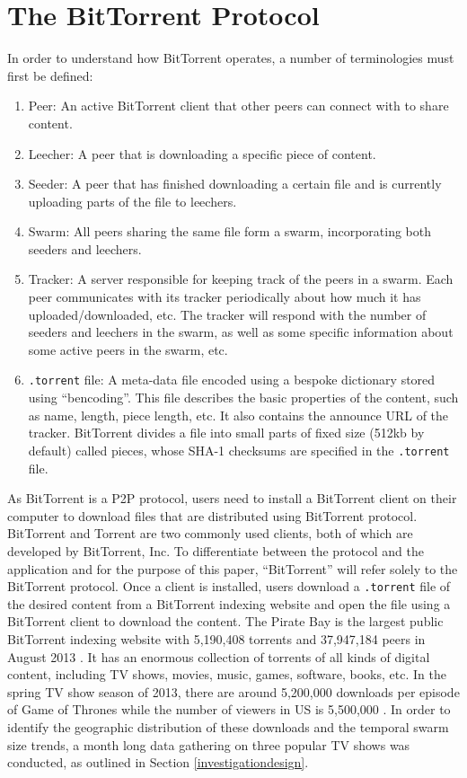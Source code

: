 \documentclass[conference]{IEEEtran}
\begin{document}
\section{The BitTorrent Protocol}
In order to understand how BitTorrent operates, a number of terminologies must first be defined:
\begin{enumerate}
\item Peer: An active BitTorrent client that other peers can connect with to share content.
\item Leecher: A peer that is downloading a specific piece of content.
\item Seeder: A peer that has finished downloading a certain file and is currently uploading parts of the file to leechers.
\item Swarm: All peers sharing the same file form a swarm, incorporating both seeders and leechers.
\item Tracker: A server responsible for keeping track of the peers in a swarm. Each peer communicates with its tracker periodically about how much it has uploaded/downloaded, etc. The tracker will respond with the number of seeders and leechers in the swarm, as well as some specific information about some active peers in the swarm, etc.
\item \texttt{.torrent} file: A meta-data file encoded using a bespoke dictionary stored using ``bencoding''. This file describes the basic properties of the content, such as name, length, piece length, etc. It also contains the announce URL of the tracker. BitTorrent divides a file into small parts of fixed size (512kb by default) called pieces, whose SHA-1 checksums are specified in the \texttt{.torrent} file.
\end{enumerate}



As BitTorrent is a P2P protocol, users need to install a BitTorrent client on their computer to download files that are distributed using BitTorrent protocol. BitTorrent and Torrent are two commonly used clients, both of which are developed by BitTorrent, Inc. To differentiate between the protocol and the application and for the purpose of this paper, ``BitTorrent'' will refer solely to the BitTorrent protocol. Once a client is installed, users download a \texttt{.torrent} file of the desired content from a BitTorrent indexing website and open the file using a BitTorrent client to download the content. The Pirate Bay is the largest public BitTorrent indexing website with 5,190,408 torrents and 37,947,184 peers in August 2013 \cite{tpb}. It has an enormous collection of torrents of all kinds of digital content, including TV shows, movies, music, games, software, books, etc. In the spring TV show season of 2013, there are around 5,200,000 downloads per episode of Game of Thrones while the number of viewers in US is 5,500,000 \cite{torrentfreak}. In order to identify the geographic distribution of these downloads and the temporal swarm size trends, a month long data gathering on three popular TV shows was conducted, as outlined in Section \ref{investigationdesign}.
\end{document}
